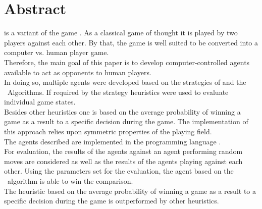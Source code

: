 \chapter*{Abstract}

\mxZitat{\ot} is a variant of the game . As a classical game of thought it is played by two players against each other. By that, the game is well suited to be converted into a computer vs. human player game.
\\Therefore, the main goal of this paper is to develop computer-controlled agents available to act as opponents to human players.
\\In doing so, multiple agents were developed based on the strategies of \abp and the \mc\ Algorithms. If required by the strategy heuristics were used to evaluate individual game states.
\\Besides other heuristics one is based on the average probability of winning a game as a result to a specific decision during the game. The implementation of this approach relies upon symmetric properties of the playing field.
\\The agents described are implemented in the programming language .
\\For evaluation, the results of the agents against an agent performing random moves are considered as well as the results of the agents playing against each other. Using the parameters set for the evaluation, the agent based on the \mc\ algorithm is able to win the comparison.
\\The heuristic based on the average probability of winning a game as a result to a specific decision during the game is outperformed by other heuristics.